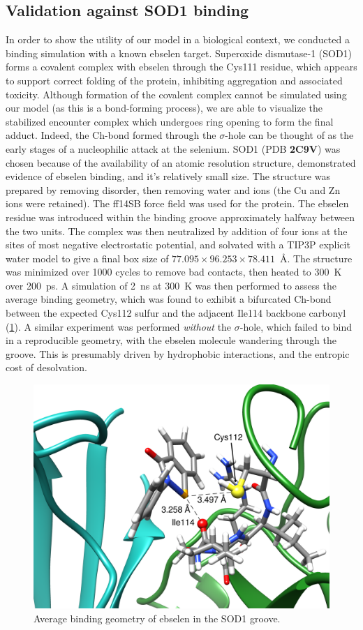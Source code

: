 \begin{refsection}
\subsection{Validation against SOD1 binding}
In order to show the utility of our model in a biological context, we conducted a binding simulation with a known ebselen target.
Superoxide dismutase-1 (SOD1) forms a covalent complex with ebselen through the Cys111 residue, which appears to support correct folding of the protein, inhibiting aggregation and associated toxicity.\autocite{Capper2018}
Although formation of the covalent complex cannot be simulated using our model (as this is a bond-forming process), we are able to visualize the stabilized encounter complex which undergoes ring opening to form the final adduct.
Indeed, the Ch-bond formed through the $\sigma$-hole can be thought of as the early stages of a nucleophilic attack at the selenium.\autocite{Thomas2015}
SOD1 (PDB \textbf{2C9V}) was chosen because of the availability of an atomic resolution structure, demonstrated evidence of ebselen binding, and it's relatively small size.\autocite{Capper2018,Strange2006}
The structure was prepared by removing disorder, then removing water and ions (the Cu and Zn ions were retained).
The ff14SB force field was used for the protein.
The ebselen residue was introduced within the binding groove approximately halfway between the two units.
The complex was then neutralized by addition of four  ions at the sites of most negative electrostatic potential, and solvated with a TIP3P explicit water model to give a final box size of $77.095\times 96.253\times 78.411$~\AA.
The structure was minimized over 1000 cycles to remove bad contacts, then heated to 300~K over 200~ps.
A simulation of 2~ns at 300~K was then performed to assess the average binding geometry, which was found to exhibit a bifurcated Ch-bond between the expected Cys112 sulfur and the adjacent Ile114 backbone carbonyl (\cref{fig:sod1-ebs}).
A similar experiment was performed \emph{without} the $\sigma$-hole, which failed to bind in a reproducible geometry, with the ebselen molecule wandering through the groove.
This is presumably driven by hydrophobic interactions, and the entropic cost of desolvation.

\begin{figure}
    \centering
    \includegraphics[width=0.75\linewidth]{Figures/bifurcated-chbond.png}
    \caption{Average binding geometry of ebselen in the SOD1 groove.}
    \label{fig:sod1-ebs}
\end{figure}


\end{refsection}
